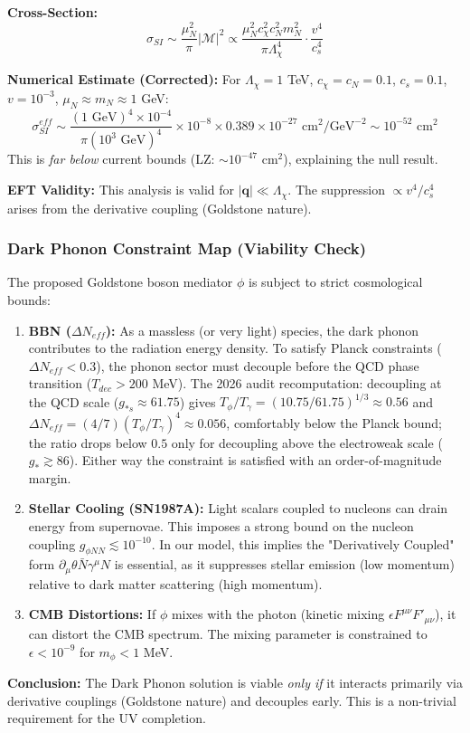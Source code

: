 \documentclass[a4paper,12pt]{article}
\begin{document}
\textbf{Cross-Section:}
\begin{equation}
\sigma_{SI} \sim \frac{\mu_N^2}{\pi} |\mathcal{M}|^2 \propto \frac{\mu_N^2 c_\chi^2 c_N^2 m_N^2}{\pi \Lambda_\chi^4} \cdot \frac{v^4}{c_s^4}
\end{equation}

\textbf{Numerical Estimate (Corrected):}
For $\Lambda_\chi = 1$ TeV, $c_\chi = c_N = 0.1$, $c_s = 0.1$, $v = 10^{-3}$, $\mu_N \approx m_N \approx 1$ GeV:
\begin{equation}
\sigma_{SI}^{eff} \sim \frac{(1 \text{ GeV})^4 \times 10^{-4}}{\pi (10^3 \text{ GeV})^4} \times 10^{-8} \times 0.389 \times 10^{-27} \text{ cm}^2/\text{GeV}^{-2} \sim 10^{-52} \text{ cm}^2
\end{equation}
This is \emph{far below} current bounds (LZ: $\sim 10^{-47}$ cm$^2$), explaining the null result.

\textbf{EFT Validity:} This analysis is valid for $|\mathbf{q}| \ll \Lambda_\chi$. The suppression $\propto v^4/c_s^4$ arises from the derivative coupling (Goldstone nature).

\subsubsection{Dark Phonon Constraint Map (Viability Check)}
The proposed Goldstone boson mediator $\phi$ is subject to strict cosmological bounds:

\begin{enumerate}
    \item \textbf{BBN ($\Delta N_{eff}$):} As a massless (or very light) species, the dark phonon contributes to the radiation energy density. To satisfy Planck constraints ($\Delta N_{eff} < 0.3$), the phonon sector must decouple before the QCD phase transition ($T_{dec} > 200$ MeV). The 2026 audit recomputation: decoupling at the QCD scale ($g_{*s} \approx 61.75$) gives $T_\phi/T_\gamma = (10.75/61.75)^{1/3} \approx 0.56$ and $\Delta N_{eff} = (4/7)(T_\phi/T_\gamma)^4 \approx 0.056$, comfortably below the Planck bound; the ratio drops below $0.5$ only for decoupling above the electroweak scale ($g_{*} \gtrsim 86$). Either way the constraint is satisfied with an order-of-magnitude margin.
    \item \textbf{Stellar Cooling (SN1987A):} Light scalars coupled to nucleons can drain energy from supernovae. This imposes a strong bound on the nucleon coupling $g_{\phi NN} \lesssim 10^{-10}$. In our model, this implies the "Derivatively Coupled" form $\partial_\mu \theta \bar{N} \gamma^\mu N$ is essential, as it suppresses stellar emission (low momentum) relative to dark matter scattering (high momentum).
    \item \textbf{CMB Distortions:} If $\phi$ mixes with the photon (kinetic mixing $\epsilon F^{\mu\nu} F'_{\mu\nu}$), it can distort the CMB spectrum. The mixing parameter is constrained to $\epsilon < 10^{-9}$ for $m_\phi < 1$ MeV.
\end{enumerate}
\textbf{Conclusion:} The Dark Phonon solution is viable \emph{only if} it interacts primarily via derivative couplings (Goldstone nature) and decouples early. This is a non-trivial requirement for the UV completion.
\end{document}
